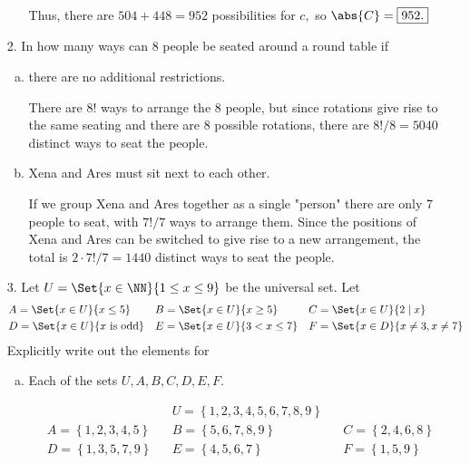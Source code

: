 \documentclass{article}
\begin{document}
\begin{itemize}
\begin{enumerate}[(a)]
\begin{soln}
					Thus, there are $504+448=952$ possibilities for $c,$ so $\abs{C}=\boxed{952.}$
				\end{soln}
				
		\end{enumerate}

	\item[2.] In how many ways can 8 people be seated around a round table if
		\begin{enumerate}[(a)]
			\item there are no additional restrictions.
				\begin{soln}
					There are $8!$ ways to arrange the 8 people, but since rotations give rise to the same seating and there are 8 possible rotations, there are $8!/8=\boxed{5040}$ distinct ways to seat the people.
				\end{soln}

			\item Xena and Ares must sit next to each other.
				\begin{soln}
					If we group Xena and Ares together as a single "person" there are only 7 people to seat, with $7!/7$ ways to arrange them. Since the positions of Xena and Ares can be switched to give rise to a new arrangement, the total is $2\cdot 7!/7=\boxed{1440}$ distinct ways to seat the people.
				\end{soln}
				
		\end{enumerate}

		\newpage
	\item[3.] Let $U=\Set{x\in\NN}{1\le x\le 9}$ be the universal set. Let
		\begin{align*}
			&A=\Set{x\in U}{x\le 5}& &B=\Set{x\in U}{x\ge5}& &C=\Set{x\in U}{2\mid x} \\
			&D=\Set{x\in U}{x\text{ is odd}} & &E=\Set{x\in U}{3<x\le 7} & &F=\Set{x\in D}{x\neq 3, x\neq 7}
		\end{align*}
		Explicitly write out the elements for
		\begin{enumerate}[(a)]
			\item Each of the sets $U, A, B, C, D, E, F.$
				\begin{answer*}
					\begin{align*}
						& & & U = \left\{ 1, 2, 3, 4, 5, 6, 7, 8, 9 \right\} & & \\
						&A = \left\{ 1, 2, 3, 4, 5 \right\} & & B = \left\{ 5, 6, 7, 8, 9 \right\} & & C = \left\{ 2, 4, 6, 8 \right\} \\
						& D = \left\{ 1, 3, 5, 7, 9 \right\} & & E = \left\{ 4, 5, 6, 7 \right\} & & F = \left\{ 1, 5, 9 \right\}
					\end{align*}
				\end{answer*}


\end{enumerate}
\end{itemize}
\end{document}
